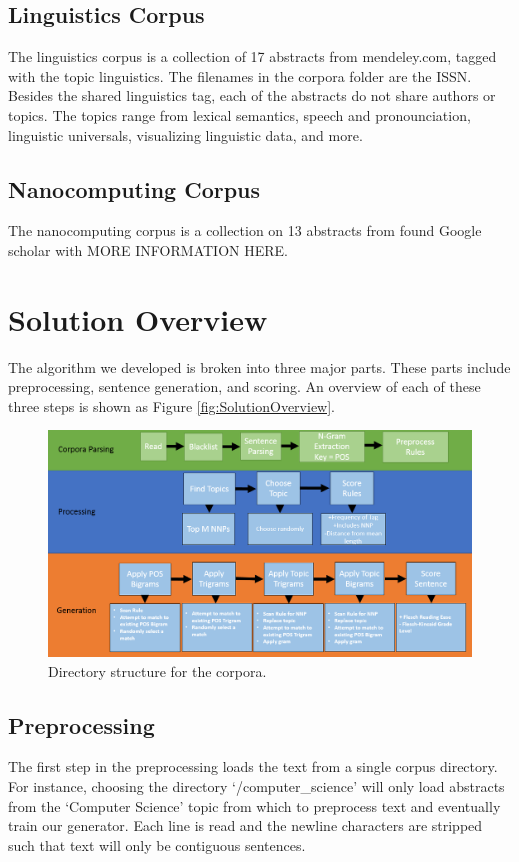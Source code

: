 \documentclass[letterpaper, 10 pt, conference]{ieeeconf}  %
\begin{document}
\subsection{Linguistics Corpus}

The linguistics corpus is a collection of 17 abstracts from mendeley.com, tagged with the topic linguistics. The filenames in the corpora folder are the ISSN. Besides the shared linguistics tag, each of the abstracts do not share authors or topics. The topics range from lexical semantics, speech and pronounciation, linguistic universals, visualizing linguistic data, and more.

\subsection{Nanocomputing Corpus}

The nanocomputing corpus is a collection on 13 abstracts from found Google scholar with MORE INFORMATION HERE.

\section{Solution Overview}

The algorithm we developed is broken into three major parts. These parts include preprocessing, sentence generation, and scoring. An overview of each of these three steps is shown as Figure \ref{fig:SolutionOverview}.

\begin{figure}[!ht]
	\centering
	\includegraphics[width=.4\textwidth]{overall_flow}
	\caption{Directory structure for the corpora.}
	\label{fig:Directorystructure}
\end{figure}

\subsection{Preprocessing}

The first step in the preprocessing loads the text from a single corpus directory. For instance, choosing the directory ‘/computer_science’ will only load abstracts from the ‘Computer Science’ topic from which to preprocess text and eventually train our generator. Each line is read and the newline characters are stripped such that text will only be contiguous sentences.
\end{document}
